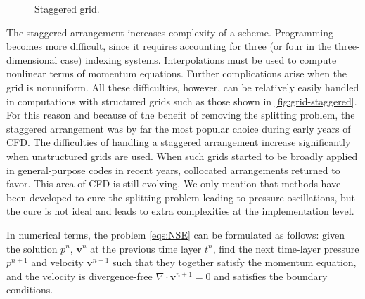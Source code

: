 \documentclass{article}
\numberwithin{equation}{section}
\begin{document}
\begin{figure}[H]
\centering
   \quad
\caption{\small Staggered grid.}
\end{figure}


The staggered arrangement increases complexity of a scheme. Programming becomes more difficult, since it requires accounting for three (or four in the three-dimensional case) indexing systems. Interpolations must be used to compute nonlinear terms of momentum equations. Further complications arise when the grid is nonuniform. All these difficulties, however, can be relatively easily handled in computations with structured grids such as those shown in \cref{fig:grid-staggered}. For this reason and because of the benefit of removing the splitting problem, the staggered arrangement was by far the most popular choice during early years of CFD. The difficulties of handling a staggered arrangement increase significantly when unstructured grids are used. When such grids started to
be broadly applied in general-purpose codes in recent years, collocated arrangements returned to favor. This area of CFD is still evolving. We only mention that methods have been developed to cure the splitting problem leading to pressure oscillations, but the cure is not ideal and leads to extra complexities at the implementation level.

In numerical terms, the problem \cref{eqs:NSE} can be formulated as follows: given the solution $p^{n}$, $\boldsymbol{v}^{n}$ at the previous time layer $t^{n}$, find the next time-layer pressure $p^{n+1}$ and velocity $\boldsymbol{v}^{n+1}$ such that they together satisfy the momentum equation, and the velocity is divergence-free $\nabla \cdot \boldsymbol{v}^{n+1} = 0$ and satisfies the boundary conditions.
\end{document}
